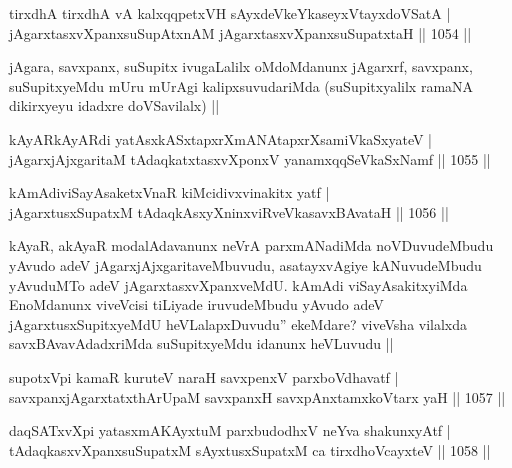 \begin{shl}
tirxdhA tirxdhA vA kalxqqpetxVH sAyxdeVkeYkaseyxVtayxdoVSatA | \\
jAgarxtasxvXpanxsuSupAtxnAM jAgarxtasxvXpanxsuSupatxtaH \hfill||  1054 ||  
\end{shl}

\begin{artha}
jAgara, savxpanx, suSupitx ivugaLalilx oMdoMdanunx jAgarxrf, savxpanx, suSupitxyeMdu mUru mUrAgi kalipxsuvudariMda (suSupitxyalilx ramaNA dikirxyeyu idadxre doVSavilalx) ||
\end{artha}


\begin{shl}
kAyARkAyARdi yatAsxkASxtapxrXmANAtapxrXsamiVkaSxyateV | \\
jAgarxjAjxgaritaM tAdaqkatxtasxvXponxV yanamxqqSeVkaSxNamf \hfill||  1055 ||  
\end{shl}
				
\begin{shl}
kAmAdiviSayAsaketxVnaR kiMcidivxvinakitx yatf | \\
jAgarxtusxSupatxM tAdaqkAsxyXninxviRveVkasavxBAvataH \hfill||  1056 ||  
\end{shl}

\begin{artha}
kAyaR, akAyaR modalAdavanunx neVrA parxmANadiMda noVDuvudeMbudu yAvudo adeV jAgarxjAjxgaritaveMbuvudu, asatayxvAgiye kANuvudeMbudu yAvuduMTo adeV jAgarxtasxvXpanxveMdU. kAmAdi viSayAsakitxyiMda EnoMdanunx viveVcisi tiLiyade iruvudeMbudu yAvudo adeV jAgarxtusxSupitxyeMdU heVLalapxDuvudu'' ekeMdare? viveVsha vilalxda savxBAvavAdadxriMda suSupitxyeMdu idanunx heVLuvudu ||
\end{artha}


\begin{shl}
supotxV\s pi kamaR kuruteV naraH savxpenxV parxboVdhavatf | \\
savxpanxjAgarxtatxthArUpaM savxpanxH savxpAnxtamxkoV\s tarx yaH \hfill||  1057 ||  
\end{shl}
				
\begin{shl}
daqSATxvX\s pi yatasxmAKAyxtuM parxbudodhxV neYva shakunxyAtf | \\
tAdaqkasxvXpanxsuSupatxM sAyxtusxSupatxM ca tirxdhoVcayxteV \hfill||  1058 ||  
\end{shl}
				
